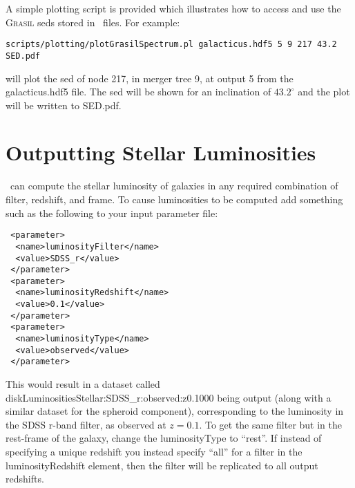 A simple plotting script is provided which illustrates how to access and use the {\normalfont \scshape Grasil} \glspl{sed} stored in \glc\ files. For example:
\begin{verbatim}
scripts/plotting/plotGrasilSpectrum.pl galacticus.hdf5 5 9 217 43.2 SED.pdf
\end{verbatim}
will plot the \gls{sed} of node 217, in merger tree 9, at output 5 from the {\normalfont \ttfamily galacticus.hdf5} file. The \gls{sed} will be shown for an inclination of $43.2^\circ$ and the plot will be written to {\normalfont \ttfamily SED.pdf}.

\section{Outputting Stellar Luminosities}

\glc\ can compute the stellar luminosity of galaxies in any required combination of filter, redshift, and frame. To cause luminosities to be computed add something such as the following to your input parameter file:
\begin{verbatim}
 <parameter>
  <name>luminosityFilter</name>
  <value>SDSS_r</value>
 </parameter>
 <parameter>
  <name>luminosityRedshift</name>
  <value>0.1</value>
 </parameter>
 <parameter>
  <name>luminosityType</name>
  <value>observed</value>
 </parameter>
\end{verbatim}
This would result in a dataset called {\normalfont \ttfamily diskLuminositiesStellar:SDSS\_r:observed:z0.1000} being output (along with a similar dataset for the spheroid component), corresponding to the luminosity in the SDSS r-band filter, as observed at $z=0.1$. To get the same filter but in the rest-frame of the galaxy, change the {\normalfont \ttfamily luminosityType} to ``{\normalfont \ttfamily rest}''. If instead of specifying a unique redshift you instead specify ``{\normalfont \ttfamily all}'' for a filter in the {\normalfont \ttfamily luminosityRedshift} element, then the filter will be replicated to all output redshifts.

